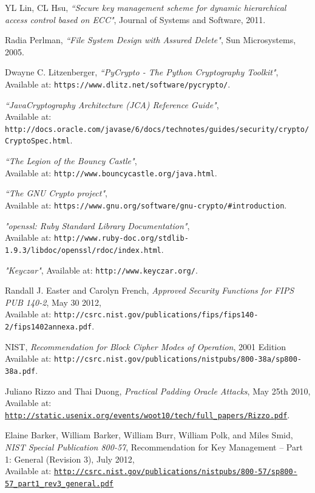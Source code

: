 \documentclass[12pt, titlepage]{article}
\begin{document}
\begin{thebibliography}{10}
YL Lin, CL Hsu, \emph{``Secure key management scheme for dynamic hierarchical access control based on ECC"}, Journal of Systems and Software, 2011.

Radia Perlman, \emph{``File System Design with Assured Delete"}, Sun Microsystems, 2005.

Dwayne C. Litzenberger, \emph{``PyCrypto - The Python Cryptography Toolkit"},
\\ Available at: \texttt{https://www.dlitz.net/software/pycrypto/}.

\emph{``Java\texttrademark Cryptography Architecture (JCA) Reference Guide"},
\\ Available at: \texttt{http://docs.oracle.com/javase/6/docs/technotes/guides/security/crypto/CryptoSpec.html}.

\emph{``The Legion of the Bouncy Castle"},
\\ Available at: \texttt{http://www.bouncycastle.org/java.html}.

\emph{``The GNU Crypto project"},
\\ Available at: \texttt{https://www.gnu.org/software/gnu-crypto/\#introduction}.

\emph{"openssl: Ruby Standard Library Documentation"},
\\ Available at: \texttt{http://www.ruby-doc.org/stdlib-1.9.3/libdoc/openssl/rdoc/index.html}.

\emph{"Keyczar"}, Available at: \texttt{http://www.keyczar.org/}.

Randall J. Easter and Carolyn French, \emph{Approved Security Functions
for FIPS PUB 140-2}, May 30 2012,
\\ Available at: \texttt{http://csrc.nist.gov/publications/fips/fips140-2/fips1402annexa.pdf}.

NIST, \emph{Recommendation for Block Cipher Modes of Operation}, 2001 Edition
\\ Available at: \texttt{http://csrc.nist.gov/publications/nistpubs/800-38a/sp800-38a.pdf}.

Juliano Rizzo and Thai Duong, \emph{Practical Padding Oracle Attacks}, May 25th 2010,
\\ Available at: \texttt{\url{http://static.usenix.org/events/woot10/tech/full_papers/Rizzo.pdf}}.


Elaine Barker, William Barker, William Burr, William Polk, and Miles Smid, \emph{NIST Special Publication 800-57}, Recommendation for Key Management – Part 1: General (Revision 3), July
2012,
\\ Available at: \texttt{\url{http://csrc.nist.gov/publications/nistpubs/800-57/sp800-57_part1_rev3_general.pdf}}


\end{thebibliography}
\end{document}
